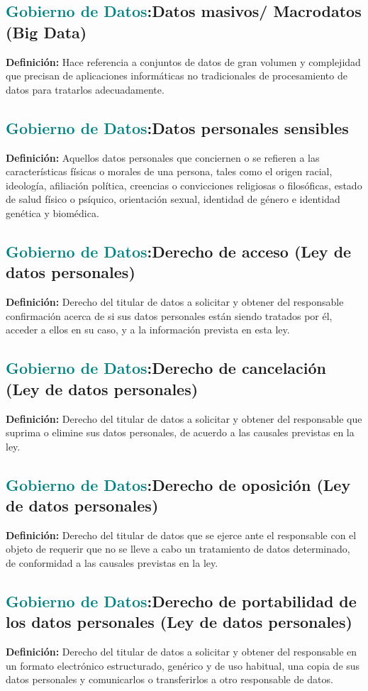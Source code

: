 \documentclass[12pt]{article}
\begin{document}
\subsection{\textcolor{teal}{Gobierno de Datos}:{Datos masivos/ Macrodatos (Big Data)}}
\textbf{Definición:} Hace referencia a conjuntos de datos de gran volumen y complejidad que precisan de aplicaciones informáticas no tradicionales de procesamiento de datos para tratarlos adecuadamente.
\subsection{\textcolor{teal}{Gobierno de Datos}:{Datos personales sensibles}}
\textbf{Definición:} Aquellos datos personales que conciernen o se refieren a las características físicas o morales de una persona, tales como el origen racial, ideología, afiliación política, creencias o convicciones religiosas o filosóficas, estado de salud físico o psíquico, orientación sexual, identidad de género e identidad genética y biomédica. 
\subsection{\textcolor{teal}{Gobierno de Datos}:{Derecho de acceso (Ley de datos personales)}}
\textbf{Definición:} Derecho del titular de datos a solicitar y obtener del responsable confirmación acerca de si sus datos personales están siendo tratados por él, acceder a ellos en su caso, y a la información prevista en esta ley. 
\subsection{\textcolor{teal}{Gobierno de Datos}:{Derecho de cancelación (Ley de datos personales)}}
\textbf{Definición:} Derecho del titular de datos a solicitar y obtener del responsable que suprima o elimine sus datos personales, de acuerdo a las causales previstas en la ley. 
\subsection{\textcolor{teal}{Gobierno de Datos}:{Derecho de oposición (Ley de datos personales)}}
\textbf{Definición:} Derecho del titular de datos que se ejerce ante el responsable con el objeto de requerir que no se lleve a cabo un tratamiento de datos determinado, de conformidad a las causales previstas en la ley. 
\subsection{\textcolor{teal}{Gobierno de Datos}:{Derecho de portabilidad de los datos personales (Ley de datos personales)}}
\textbf{Definición:} Derecho del titular de datos a solicitar y obtener del responsable en un formato electrónico estructurado, genérico y de uso habitual, una copia de sus datos personales y comunicarlos o transferirlos a otro responsable de datos.
\end{document}
